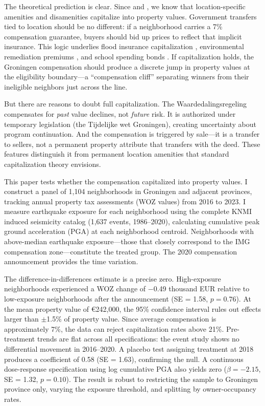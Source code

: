 \documentclass[12pt]{article}
\begin{document}
The theoretical prediction is clear. Since \citet{oates1969} and \citet{rosen1974}, we know that location-specific amenities and disamenities capitalize into property values. Government transfers tied to location should be no different: if a neighborhood carries a 7\% compensation guarantee, buyers should bid up prices to reflect that implicit insurance. This logic underlies flood insurance capitalization \citep{bin2008, gallagher2014}, environmental remediation premiums \citep{muehlenbachs2015}, and school spending bonds \citep{cellini2010}. If capitalization holds, the Groningen compensation should produce a discrete jump in property values at the eligibility boundary---a ``compensation cliff'' separating winners from their ineligible neighbors just across the line.

But there are reasons to doubt full capitalization. The Waardedalingsregeling compensates for \emph{past} value declines, not \emph{future} risk. It is authorized under temporary legislation (the Tijdelijke wet Groningen), creating uncertainty about program continuation. And the compensation is triggered by sale---it is a transfer to sellers, not a permanent property attribute that transfers with the deed. These features distinguish it from permanent location amenities that standard capitalization theory envisions.

This paper tests whether the compensation capitalized into property values. I construct a panel of 1,104 neighborhoods in Groningen and adjacent provinces, tracking annual property tax assessments (WOZ values) from 2016 to 2023. I measure earthquake exposure for each neighborhood using the complete KNMI induced seismicity catalog (1,637 events, 1986--2020), calculating cumulative peak ground acceleration (PGA) at each neighborhood centroid. Neighborhoods with above-median earthquake exposure---those that closely correspond to the IMG compensation zone---constitute the treated group. The 2020 compensation announcement provides the time variation.

The difference-in-differences estimate is a precise zero. High-exposure neighborhoods experienced a WOZ change of $-$0.49 thousand EUR relative to low-exposure neighborhoods after the announcement (SE = 1.58, $p = 0.76$). At the mean property value of \euro 242,000, the 95\% confidence interval rules out effects larger than $\pm$1.5\% of property value. Since average compensation is approximately 7\%, the data can reject capitalization rates above 21\%. Pre-treatment trends are flat across all specifications: the event study shows no differential movement in 2016--2020. A placebo test assigning treatment at 2018 produces a coefficient of 0.58 (SE = 1.63), confirming the null. A continuous dose-response specification using log cumulative PGA also yields zero ($\beta = -2.15$, SE = 1.32, $p = 0.10$). The result is robust to restricting the sample to Groningen province only, varying the exposure threshold, and splitting by owner-occupancy rates.
\end{document}
